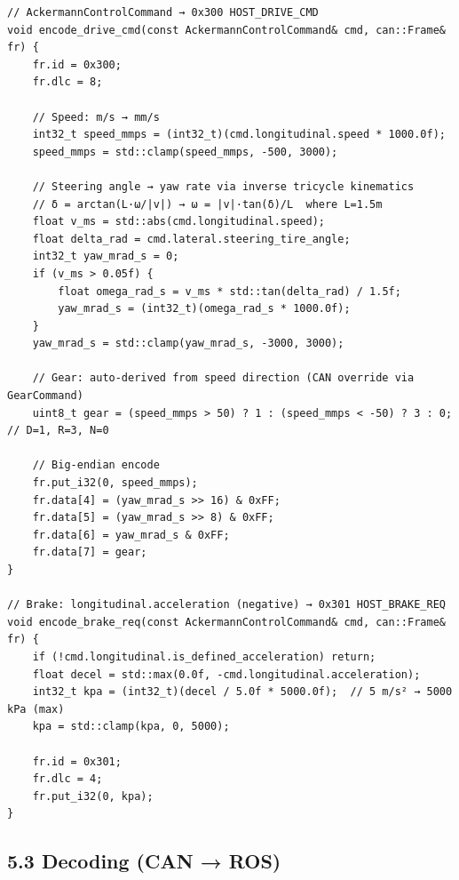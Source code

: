 \documentclass[12pt,a4paper,oneside]{report}
\begin{document}
\begin{verbatim}
// AckermannControlCommand → 0x300 HOST_DRIVE_CMD
void encode_drive_cmd(const AckermannControlCommand& cmd, can::Frame& fr) {
    fr.id = 0x300;
    fr.dlc = 8;
    
    // Speed: m/s → mm/s
    int32_t speed_mmps = (int32_t)(cmd.longitudinal.speed * 1000.0f);
    speed_mmps = std::clamp(speed_mmps, -500, 3000);
    
    // Steering angle → yaw rate via inverse tricycle kinematics
    // δ = arctan(L·ω/|v|) → ω = |v|·tan(δ)/L  where L=1.5m
    float v_ms = std::abs(cmd.longitudinal.speed);
    float delta_rad = cmd.lateral.steering_tire_angle;
    int32_t yaw_mrad_s = 0;
    if (v_ms > 0.05f) {
        float omega_rad_s = v_ms * std::tan(delta_rad) / 1.5f;
        yaw_mrad_s = (int32_t)(omega_rad_s * 1000.0f);
    }
    yaw_mrad_s = std::clamp(yaw_mrad_s, -3000, 3000);
    
    // Gear: auto-derived from speed direction (CAN override via GearCommand)
    uint8_t gear = (speed_mmps > 50) ? 1 : (speed_mmps < -50) ? 3 : 0;  // D=1, R=3, N=0
    
    // Big-endian encode
    fr.put_i32(0, speed_mmps);
    fr.data[4] = (yaw_mrad_s >> 16) & 0xFF;
    fr.data[5] = (yaw_mrad_s >> 8) & 0xFF;
    fr.data[6] = yaw_mrad_s & 0xFF;
    fr.data[7] = gear;
}

// Brake: longitudinal.acceleration (negative) → 0x301 HOST_BRAKE_REQ
void encode_brake_req(const AckermannControlCommand& cmd, can::Frame& fr) {
    if (!cmd.longitudinal.is_defined_acceleration) return;
    float decel = std::max(0.0f, -cmd.longitudinal.acceleration);
    int32_t kpa = (int32_t)(decel / 5.0f * 5000.0f);  // 5 m/s² → 5000 kPa (max)
    kpa = std::clamp(kpa, 0, 5000);
    
    fr.id = 0x301;
    fr.dlc = 4;
    fr.put_i32(0, kpa);
}
\end{verbatim}

\subsection{5.3 Decoding (CAN → ROS)}\label{decoding-can-ros}
\end{document}
